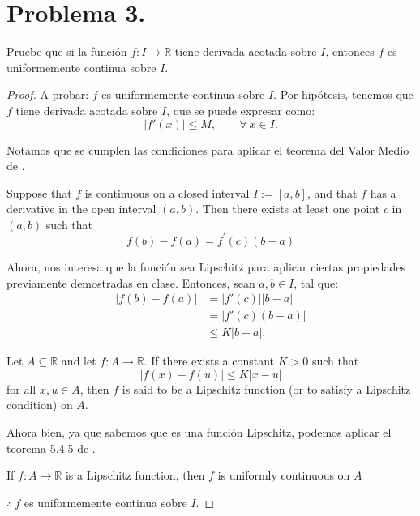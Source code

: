 \section{Problema 3.} Pruebe que si la función $f: I \rightarrow \mathbb{R}$ tiene derivada acotada sobre $I$, entonces $f$ es
uniformemente continua sobre $I$.

\begin{proof}
A probar: $f$ es uniformemente continua sobre $I$. Por hipótesis, tenemos que $f$ tiene derivada acotada sobre $I$, que se puede expresar como: $$|f'(x)|\leq M,\qquad \forall \ x\in I.$$

Notamos que se cumplen las condiciones para aplicar el teorema del Valor Medio de \cite{bartle2000introduction}.
\begin{tcolorbox}[colback=gray!15,colframe=gray!1!gray,title=Teorema del Valor Medio 6.2.4 de \cite{bartle2000introduction}.]
Suppose that $f$ is continuous on a closed interval $I:=[a, b]$, and that $f$ has a derivative in the open interval $(a, b) .$ Then there exists at least one point $c$ in $(a, b)$ such that
$$
f(b)-f(a)=f^{\prime}(c)(b-a)
$$
\end{tcolorbox}

Ahora, nos interesa que la función sea Lipschitz para aplicar ciertas propiedades previamente demostradas en clase. Entonces, sean $a,b\in I$, tal que: 
\begin{align*}
    |f(b)-f(a)|&=|f'(c)||b-a|\\
               &= |f'(c)(b-a)|\\
               &\leq K|b-a|.
\end{align*}


\begin{tcolorbox}[colback=blue!15,colframe=blue!1!blue,title=Definición 5.4.4 de \cite{bartle2000introduction}.]
Let $A \subseteq \mathbb{R}$ and let $f: A \rightarrow \mathbb{R}$. If there exists a constant $K>0$ such that
$$
|f(x)-f(u)| \leq K|x-u|
$$
for all $x, u \in A$, then $f$ is said to be a Lipschitz function (or to satisfy a Lipschitz condition) on $A$.
\end{tcolorbox}

Ahora bien, ya que sabemos que es una función Lipschitz, podemos aplicar el teorema 5.4.5 de \cite{bartle2000introduction}.
\begin{tcolorbox}[colback=gray!15,colframe=gray!1!gray,title=Teorema 5.4.5 de \cite{bartle2000introduction}.]
If $f: A \rightarrow \mathbb{R}$ is a Lipschitz function, then $f$ is uniformly continuous on $A$
\end{tcolorbox}
$\therefore \ f$ es uniformemente continua sobre $I$.  

\end{proof}
